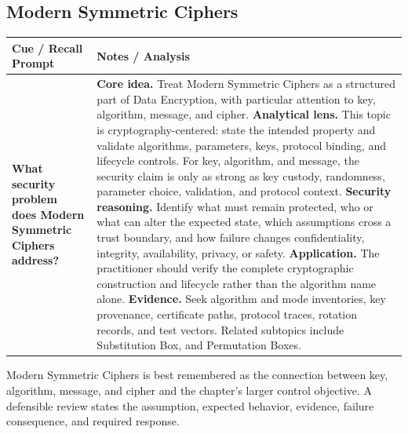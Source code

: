 \documentclass[11pt]{article}
\newcommand{\CornellHeader}{%
\rowcolor{Navy}\color{white}\bfseries Cue / Recall Prompt & \color{white}\bfseries Notes / Analysis\\\hline}
\newcommand{\CornellRow}[2]{%
\cellcolor{CueGray}\RaggedRight\textbf{#1} & \RaggedRight #2\\\hline}
\begin{document}
\subsection*{Modern Symmetric Ciphers}
\begin{longtable}{>{\RaggedRight\arraybackslash}p{}|>{\RaggedRight\arraybackslash}p{}}
\CornellHeader
\CornellRow{What security problem does Modern Symmetric Ciphers address?}{\textbf{Core idea.} Treat Modern Symmetric Ciphers as a structured part of Data Encryption, with particular attention to key, algorithm, message, and cipher. \textbf{Analytical lens.} This topic is cryptography-centered: state the intended property and validate algorithms, parameters, keys, protocol binding, and lifecycle controls. For key, algorithm, and message, the security claim is only as strong as key custody, randomness, parameter choice, validation, and protocol context. \textbf{Security reasoning.} Identify what must remain protected, who or what can alter the expected state, which assumptions cross a trust boundary, and how failure changes confidentiality, integrity, availability, privacy, or safety. \textbf{Application.} The practitioner should verify the complete cryptographic construction and lifecycle rather than the algorithm name alone. \textbf{Evidence.} Seek algorithm and mode inventories, key provenance, certificate paths, protocol traces, rotation records, and test vectors. Related subtopics include Substitution Box, and Permutation Boxes.}
\end{longtable}
\begin{topicsummary}
Modern Symmetric Ciphers is best remembered as the connection between key, algorithm, message, and cipher and the chapter's larger control objective. A defensible review states the assumption, expected behavior, evidence, failure consequence, and required response.
\end{topicsummary}
\end{document}
